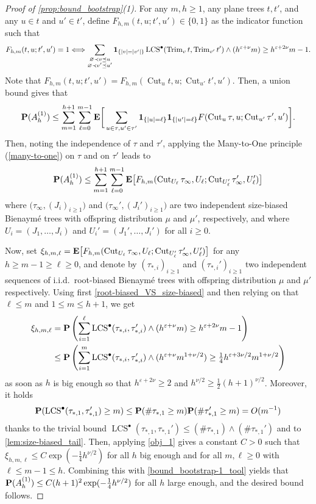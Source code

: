 \documentclass[11pt,reqno]{amsart}
\newcommand{\Cut}{\operatorname{Cut}}
\newcommand{\Trim}{\operatorname{Trim}}
\newcommand{\LCS}{\operatorname{LCS}}
\begin{document}
\begin{proof}[Proof of \cref{prop:bound_bootstrap}(1)]
    For any $m,h\geq 1$, any plane trees $t,t'$, and any $u\in t$ and $u'\in t'$, define $F_{h,m}(t,u;t',u')\in\{0,1\}$ as the indicator function such that 
    \[F_{h,m}(t,u;t',u')=1 \Longleftrightarrow \sum_{\substack{\varnothing\prec v\preceq u\\ \varnothing\prec v'\preceq u'}}\I{|v|=|v'|}\LCS^\bullet(\Trim_v t,\Trim_{v'} t')\wedge (h^{\varepsilon+\nu} m)\geq h^{\varepsilon+2\nu}m-1.\]
    Note that $F_{h,m}(t,u;t',u')=F_{h,m}(\Cut_u t,u;\Cut_{u'} t',u')$. Then, a union bound gives that
    \[\prob(A_h^{(1)})\leq \sum_{m=1}^{h+1}\sum_{\ell=0}^{m-1}\E\bigg[\sum_{u\in\tau, u'\in\tau'}\I{|u|=\ell}\I{|u'|=\ell}F(\Cut_u \tau,u;\Cut_{u'} \tau',u')\bigg].\]
    Then, noting the independence of $\tau$ and $\tau'$, applying the Many-to-One principle (\cref{many-to-one}) on $\tau$ and on $\tau'$ leads to
    \begin{equation}
\label{bound_bootstrap-1_tool}
    \prob(A_h^{(1)}) \leq \sum_{m=1}^{h+1} \sum_{\ell=0}^{m-1}\E\big[F_{h,m}(\Cut_{U_\ell}\tau_\infty,U_\ell;\Cut_{U_\ell'}\tau_\infty',U_\ell')\big]
    \end{equation}
    where $\big(\tau_\infty,(J_i)_{i\geq 1}\big)$ and $\big(\tau_\infty',(J_i')_{i\geq 1}\big)$ are two independent size-biased Bienaym\'{e} trees with offspring distribution $\mu$ and $\mu'$, respectively, and where $U_i = (J_1,\ldots,J_i)$ and $U_i' = (J_1',\ldots,J_i')$ for all $i\geq 0$.
    
    Now, set $\xi_{h,m,\ell}=\E\big[F_{h,m}(\Cut_{U_\ell}\tau_\infty,U_\ell;\Cut_{U_\ell'}\tau_\infty',U_\ell')\big]$ for any $h\geq m-1\geq \ell\geq 0$, and denote by $(\tau_{*,i})_{i\geq 1}$ and $(\tau_{*,i}')_{i\geq 1}$ two independent sequences of i.i.d.~root-biased Bienaym\'{e} trees with offspring distribution $\mu$ and $\mu'$ respectively. Using first \cref{root-biased_VS_size-biased} and then relying on that $\ell\leq m$ and $1\leq m \leq h+1$, we get
    \begin{align*}
    \xi_{h,m,\ell}&=\prob\left(\sum_{i=1}^\ell \LCS^\bullet(\tau_{*,i},\tau_{*,i}')\wedge  (h^{\e + \nu} m) \geq h^{\e + 2\nu}m-1\right)\\
    &\leq \prob\left(\sum_{i=1}^m \LCS^\bullet(\tau_{*,i},\tau_{*,i}')\wedge  (h^{\e + \nu} m^{1+\nu/2}) \geq \tfrac{1}{4}h^{\e + 3\nu/2}m^{1+\nu/2}\right)
    \end{align*}
    as soon as $h$ is big enough so that $h^{\varepsilon+2\nu}\geq 2$ and $h^{\nu/2}\geq \tfrac{1}{2}(h+1)^{\nu/2}$. Moreover, it holds
    \[\prob(\LCS^\bullet(\tau_{*,1}, \tau_{*,1}') \geq m) \leq \prob(\#\tau_{*,1}\geq m)\prob(\#\tau_{*,1}' \geq m) = O(m^{-1})\]
    thanks to the trivial bound $\LCS^\bullet(\tau_{*,1}, \tau_{*,1}')\leq (\#\tau_{*,1})\wedge (\#\tau_{*,1}')$ and to \cref{lem:size-biased_tail}. Then, applying \cref{obj_1} gives a constant $C > 0$ such that $\xi_{h,m,\ell}\leq C\exp(-\tfrac{1}{4}h^{\nu/2})$ for all $h$ big enough and for all $m,\ell\geq 0$ with $\ell\leq m-1\leq h$. Combining this with \eqref{bound_bootstrap-1_tool} yields that $\mathbf{P}(A_h^{(1)})\leq C (h+1)^2 \exp(-\tfrac{1}{4}h^{\nu/2})$ for all $h$ large enough, and the desired bound follows.
\end{proof}
\end{document}
